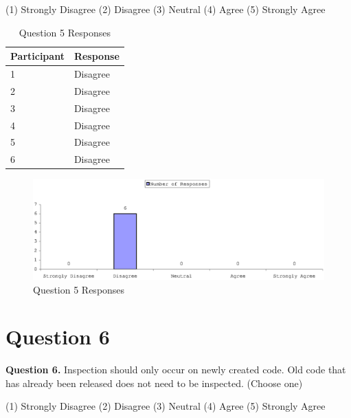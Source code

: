 (1) Strongly Disagree (2) Disagree (3) Neutral (4) Agree (5) Strongly Agree

\begin{table}[!h]
  \begin{center}
    \caption{Question 5 Responses}
    \label{tab:pre-selection-questionnaire-results-5}
    \begin{tabular}{|p{5.0cm}|p{8.0cm}|} \hline
{\bf Participant} & {\bf Response} \\ \hline
1 & Disagree \\ \hline
2 & Disagree \\ \hline
3 & Disagree \\ \hline
4 & Disagree \\ \hline
5 & Disagree \\ \hline
6 & Disagree \\ \hline
    \end{tabular}
  \end{center}
\end{table}

\begin{figure}[htb]
  \centering
  \includegraphics[width=1.0\textwidth]{figs/Results/pre-selection-questionnaire-5.eps}
  \caption{Question 5 Responses}
  \label{fig:pre-selection-questionnaire-results-5}
\end{figure}


\clearpage
\section{Question 6}
\label{appendix:section:question6}
\noindent \textbf{Question 6.} Inspection should only occur on newly
created code. Old code that has already been released does not need to be
inspected. (Choose one)

(1) Strongly Disagree (2) Disagree (3) Neutral (4) Agree (5) Strongly Agree

